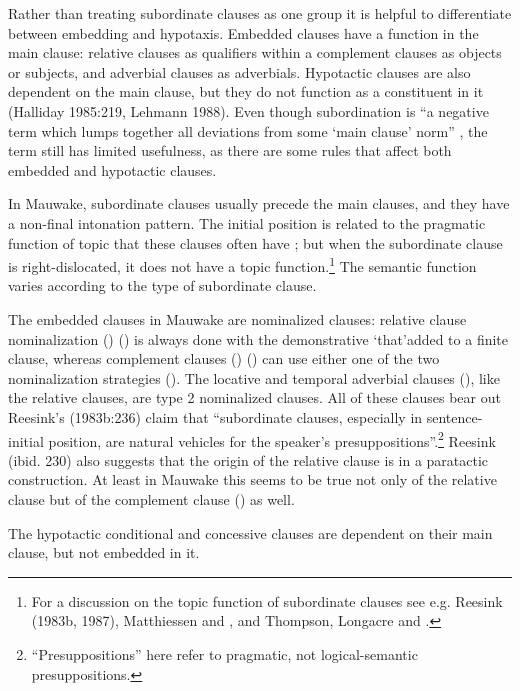 Rather than treating subordinate clauses as one group it is helpful to differentiate between embedding and hypotaxis. Embedded clauses have a function in the main clause: relative clauses as qualifiers within a  complement clauses as objects or subjects, and adverbial clauses as adverbials. Hypotactic clauses are also dependent on the main clause, but they do not function as a constituent in it (Halliday 1985:219, Lehmann 1988). Even though subordination is ``a negative term which lumps together all deviations from some `main clause' norm'' \citep[510]{HaimanEtAl1984}%
, the term still has limited usefulness, as there are some rules that affect both embedded and hypotactic clauses.  

In Mauwake, subordinate clauses usually precede the main clauses, and they have a non-final intonation pattern. The initial position is related to the pragmatic function of topic that these clauses often have \citep[187]{Lehmann1988}; but when the subordinate clause is right-dislocated, it does not have a topic function.\footnote{For a discussion on the topic function of subordinate clauses see e.g. Reesink (1983b, 1987), Matthiessen and \citet{Thompson1988}, \citet{Lehmann1988} and Thompson, Longacre and \citet{Hwang2007}.}  The semantic function varies according to the type of subordinate clause. 

The embedded clauses in Mauwake are nominalized clauses: relative clause nominalization () () is always done with the demonstrative \textstyleStyleVernacularWordsItalic{} `that'added to a finite clause, whereas complement clauses () () can use either one of the two nominalization strategies (). The locative and temporal adverbial clauses (), like the relative clauses, are type 2 nominalized clauses. All of these clauses bear out Reesink's (1983b:236) claim that ``subordinate clauses, especially in sentence-initial position, are natural vehicles for the speaker's presuppositions''.\footnote{``Presuppositions'' here refer to pragmatic, not logical-semantic presuppositions.}  Reesink (ibid. 230) also suggests that the origin of the relative clause is in a paratactic construction. At least in Mauwake this seems to be true not only of the relative clause but of the complement clause () as well. 

The hypotactic conditional and concessive clauses are dependent on their main clause, but not embedded in it. 

